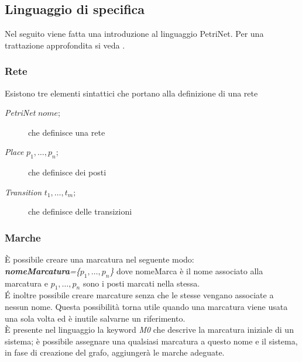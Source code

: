 \documentclass[italian,12pt]{book}
\begin{document}
\subsection{Linguaggio di specifica}\label{subsec:componenti_del_linguaggio}
% 
Nel seguito viene fatta una introduzione al linguaggio
PetriNet. Per una trattazione approfondita si veda
\cite{FAG10}.
%
\subsubsection{Rete}
Esistono tre elementi sintattici che portano alla definizione di una rete
\begin{description}
\item[\emph{PetriNet} $nome;$] che definisce una rete
\item[\emph{Place} $p_1, \dots ,p_n;$] che definisce dei
  posti
\item[\emph{Transition} $t_1, \dots ,t_m;$] che definisce
  delle transizioni
\end{description}
% 
\subsubsection{Marche}
\`E possibile creare una marcatura nel seguente modo:\\
\emph{{\bf nomeMarcatura}=\{$p_1,\dots,p_n$\}} dove nomeMarca
  è il nome associato alla marcatura e $p_1,\dots,p_n$
  sono i posti marcati nella stessa.\\
\'E inoltre possibile creare marcature senza che le
stesse vengano associate a nessun nome. Questa
possibilità torna utile quando una marcatura viene usata
una sola volta ed è inutile salvarne un riferimento.\\
\`E presente nel linguaggio la keyword \emph{M0} che descrive la
marcatura iniziale di un sistema; è possibile assegnare
una qualsiasi marcatura a questo nome e il sistema, in
fase di creazione del grafo, aggiungerà le marche
adeguate.
% 
\end{document}
